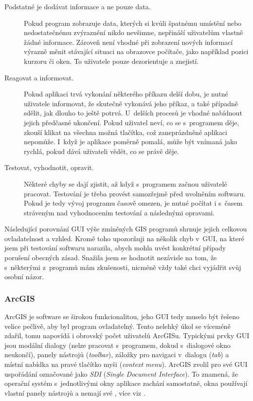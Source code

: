 \documentclass[a4paper,12pt,draft]{article}
\begin{document}
\begin{description}
\item [Podstatné je dodávat informace a ne pouze data.] Pokud program
zobrazuje data, kterých si kvůli špatnému umístění nebo nedostatečnému
zvýraznění nikdo nevšimne, nepřináší uživatelům vlastně žádné
informace. Zároveň není vhodné při zobrazení nových informací výrazně
měnit stávající situaci na obrazovce počítače, jako například pozici
kurzoru či oken. To uživatele pouze dezorientuje a znejistí.

\item [Reagovat a informovat.] Pokud aplikaci trvá vykonání některého příkazu
delší dobu, je nutné uživatele informovat, že skutečně vykonává
jeho příkaz, a také případně sdělit, jak dlouho to ještě potrvá.
U~delších procesů je vhodné nabídnout jejich předčasné ukončení. Pokud
uživatel neví, co se s~programem děje, zkouší klikat na všechna možná
tlačítka, což zaneprázdněné aplikaci nepomůže. I~když je aplikace
poměrně pomalá, může být vnímaná jako rychlá, pokud dává uživateli
vědět, co se právě děje.

\item [Testovat, vyhodnotit, opravit.] Některé chyby se dají zjistit,
až když s~programem začnou uživatelé pracovat. Testování je třeba
provést samozřejmě před uvolněním softwaru. Pokud je tedy vývoj
programu časově omezen, je nutné počítat i s~časem stráveným nad
vyhodnocením testování a následnými opravami.
 \end{description}

Následující porovnání GUI
výše zmíněných GIS programů shrnuje jejich celkovou ovladatelnost a
vzhled. Kromě toho upozorňuji na několik chyb v~GUI, na které jsem při
testování softwaru narazila, abych mohla uvést konkrétní případy
porušení obecných zásad. Snažila jsem se hodnotit nezávisle na tom,
že s~některými z~programů mám zkušenosti, nicméně vždy také chci
vyjádřit svůj osobní názor.

\subsubsection{ArcGIS}
ArcGIS je software se širokou funkcionalitou, jeho GUI tedy
muselo být řešeno velice pečlivě, aby byl program ovladatelný. Tento
nelehký úkol se víceméně zdařil, tomu napovídá i obrovský počet
uživatelů ArcGISu. Typickými prvky GUI jsou modální
dialogy (nelze pracovat s~programem, dokud s~dialogové okno neukončí),
panely nástrojů (\emph{toolbar}), záložky pro navigaci v~dialogu (\emph{tab}) a
místní
nabídka na pravé tlačítko myši (\emph{context menu}). ArcGIS zvolil pro své 
GUI uspořádání označované jako \emph{SDI} (\emph{Single Document
Interface}). To znamená, že operační systém s~jednotlivými okny aplikace
zachází samostatně, okna používají vlastní panely nástrojů a nemají
své , více viz \cite{wiki_SDI}.
\end{document}
